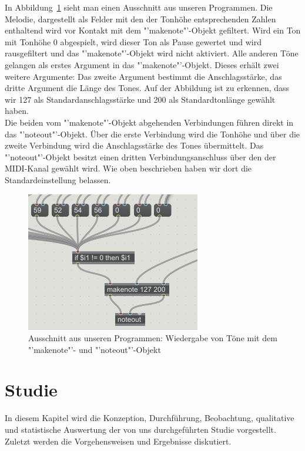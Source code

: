 \documentclass{acm_proc_article-sp}
\begin{document}
In Abbildung~\ref{pic:max} sieht man einen Ausschnitt aus unseren Programmen. Die Melodie, dargestellt als Felder mit den der Tonhöhe entsprechenden Zahlen enthaltend wird vor Kontakt mit dem "'makenote"'-Objekt gefiltert. Wird ein Ton mit Tonhöhe 0 abgespielt, wird dieser Ton als Pause gewertet und wird rausgefiltert und das "'makenote"'-Objekt wird nicht aktiviert. Alle anderen Töne gelangen als erstes Argument in das "'makenote"'-Objekt. Dieses erhält zwei weitere Argumente: Das zweite Argument bestimmt die Anschlagsstärke, das dritte Argument die Länge des Tones. Auf der Abbildung ist zu erkennen, dass wir 127 als Standardanschlagsstärke und 200 als Standardtonlänge gewählt haben.\\
Die beiden vom "'makenote"'-Objekt abgehenden Verbindungen führen direkt in das "'noteout"'-Objekt. Über die erste Verbindung wird die Tonhöhe und über die zweite Verbindung wird die Anschlagsstärke des Tones übermittelt. Das "'noteout"'-Objekt besitzt einen dritten Verbindungsanschluss über den der MIDI-Kanal gewählt wird. Wie oben beschrieben haben wir dort die Standardeinstellung belassen.
\begin{figure}[H]
\centering
\includegraphics[width=1.0\linewidth]{Abbildungen/max.png}
\caption{Ausschnitt aus unseren Programmen: Wiedergabe von Töne mit dem "'makenote"'- und "'noteout"'-Objekt}
\label{pic:max}
\end{figure}

\section{Studie}
In diesem Kapitel wird die Konzeption, Durchführung, Beobachtung, qualitative und statistische Auswertung der von uns durchgeführten Studie vorgestellt. Zuletzt werden die Vorgehensweisen und Ergebnisse diskutiert.
\end{document}
